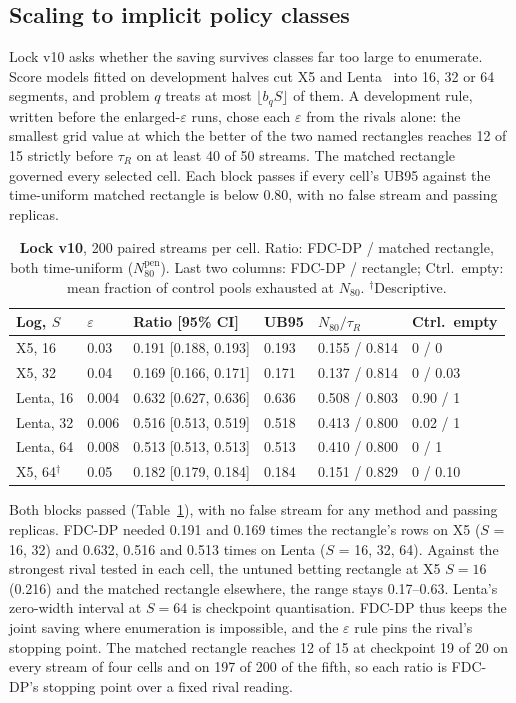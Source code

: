 \documentclass[sigconf,anonymous,review]{acmart}
\newcommand{\eps}{\varepsilon}
\newcommand{\Npen}{N_{80}^{\text{pen}}}
\begin{document}
\subsection{Scaling to implicit policy classes}\label{sec:scale}

Lock v10 asks whether the saving survives classes far too large to enumerate. Score models fitted on development halves cut X5 and Lenta~\citep{scikituplift2020} into 16, 32 or 64 segments, and problem $q$ treats at most $\lfloor b_q S \rfloor$ of them. A development rule, written before the enlarged-$\eps$ runs, chose each $\eps$ from the rivals alone: the smallest grid value at which the better of the two named rectangles reaches 12 of 15 strictly before $\tau_R$ on at least 40 of 50 streams. The matched rectangle governed every selected cell. Each block passes if every cell's UB95 against the time-uniform matched rectangle is below 0.80, with no false stream and passing replicas.

\begin{table}[t]
\caption{\textbf{Lock v10}, 200 paired streams per cell. Ratio: FDC-DP / matched rectangle, both time-uniform ($\Npen$). Last two columns: FDC-DP / rectangle; Ctrl.\ empty: mean fraction of control pools exhausted at $N_{80}$. $^\dagger$Descriptive.}
\label{tab:scale}
\small
\setlength{\tabcolsep}{2.6pt}
\begin{tabular}{@{}llllll@{}}
\toprule
Log, $S$ & $\eps$ & Ratio [95\% CI] & UB95 & $N_{80}/\tau_R$ & Ctrl.\ empty \\
\midrule
X5, 16 & 0.03 & 0.191 [0.188, 0.193] & 0.193 & 0.155 / 0.814 & 0 / 0 \\
X5, 32 & 0.04 & 0.169 [0.166, 0.171] & 0.171 & 0.137 / 0.814 & 0 / 0.03 \\
Lenta, 16 & 0.004 & 0.632 [0.627, 0.636] & 0.636 & 0.508 / 0.803 & 0.90 / 1 \\
Lenta, 32 & 0.006 & 0.516 [0.513, 0.519] & 0.518 & 0.413 / 0.800 & 0.02 / 1 \\
Lenta, 64 & 0.008 & 0.513 [0.513, 0.513] & 0.513 & 0.410 / 0.800 & 0 / 1 \\
X5, 64$^\dagger$ & 0.05 & 0.182 [0.179, 0.184] & 0.184 & 0.151 / 0.829 & 0 / 0.10 \\
\bottomrule
\end{tabular}
\end{table}

Both blocks passed (Table~\ref{tab:scale}), with no false stream for any method and passing replicas. FDC-DP needed 0.191 and 0.169 times the rectangle's rows on X5 ($S$ = 16, 32) and 0.632, 0.516 and 0.513 times on Lenta ($S$ = 16, 32, 64). Against the strongest rival tested in each cell, the untuned betting rectangle at X5 $S = 16$ (0.216) and the matched rectangle elsewhere, the range stays 0.17--0.63. Lenta's zero-width interval at $S = 64$ is checkpoint quantisation. FDC-DP thus keeps the joint saving where enumeration is impossible, and the $\eps$ rule pins the rival's stopping point. The matched rectangle reaches 12 of 15 at checkpoint 19 of 20 on every stream of four cells and on 197 of 200 of the fifth, so each ratio is FDC-DP's stopping point over a fixed rival reading.
\end{document}
